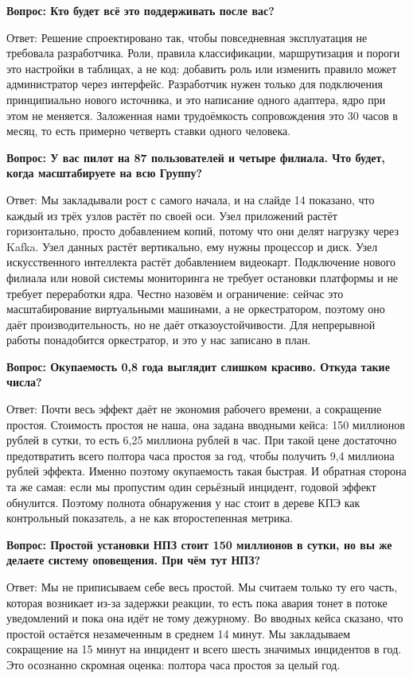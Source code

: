 \documentclass[11pt]{article}
\newcommand{\qa}[2]{%
\par\vspace{7pt}%
{\bfseries Вопрос: #1}\par\vspace{2pt}
{Ответ: #2}\par\vspace{4pt}}
\begin{document}
\qa{Кто будет всё это поддерживать после вас?}
{Решение спроектировано так, чтобы повседневная эксплуатация не требовала
разработчика. Роли, правила классификации, маршрутизация и пороги это
настройки в таблицах, а не код: добавить роль или изменить правило может
администратор через интерфейс. Разработчик нужен только для подключения
принципиально нового источника, и это написание одного адаптера, ядро при этом
не меняется. Заложенная нами трудоёмкость сопровождения это 30 часов в месяц,
то есть примерно четверть ставки одного человека.}

\qa{У вас пилот на 87 пользователей и четыре филиала. Что будет, когда
масштабируете на всю Группу?}
{Мы закладывали рост с самого начала, и на слайде 14 показано, что каждый из
трёх узлов растёт по своей оси. Узел приложений растёт горизонтально, просто
добавлением копий, потому что они делят нагрузку через Kafka. Узел данных
растёт вертикально, ему нужны процессор и диск. Узел искусственного интеллекта
растёт добавлением видеокарт. Подключение нового филиала или новой системы
мониторинга не требует остановки платформы и не требует переработки ядра.
Честно назовём и ограничение: сейчас это масштабирование виртуальными
машинами, а не оркестратором, поэтому оно даёт производительность, но не даёт
отказоустойчивости. Для непрерывной работы понадобится оркестратор, и это у
нас записано в план.}

\qa{Окупаемость 0,8 года выглядит слишком красиво. Откуда такие числа?}
{Почти весь эффект даёт не экономия рабочего времени, а сокращение простоя.
Стоимость простоя не наша, она задана вводными кейса: 150 миллионов рублей в
сутки, то есть 6,25 миллиона рублей в час. При такой цене достаточно
предотвратить всего полтора часа простоя за год, чтобы получить
9,4 миллиона рублей эффекта. Именно поэтому окупаемость такая быстрая. И
обратная сторона та же самая: если мы пропустим один серьёзный инцидент,
годовой эффект обнулится. Поэтому полнота обнаружения у нас стоит в дереве
КПЭ как контрольный показатель, а не как второстепенная метрика.}

\qa{Простой установки НПЗ стоит 150 миллионов в сутки, но вы же делаете
систему оповещения. При чём тут НПЗ?}
{Мы не приписываем себе весь простой. Мы считаем только ту его часть, которая
возникает из-за задержки реакции, то есть пока авария тонет в потоке
уведомлений и пока она идёт не тому дежурному. Во вводных кейса сказано, что
простой остаётся незамеченным в среднем 14 минут. Мы закладываем сокращение
на 15 минут на инцидент и всего шесть значимых инцидентов в год. Это
осознанно скромная оценка: полтора часа простоя за целый год.}
\end{document}
